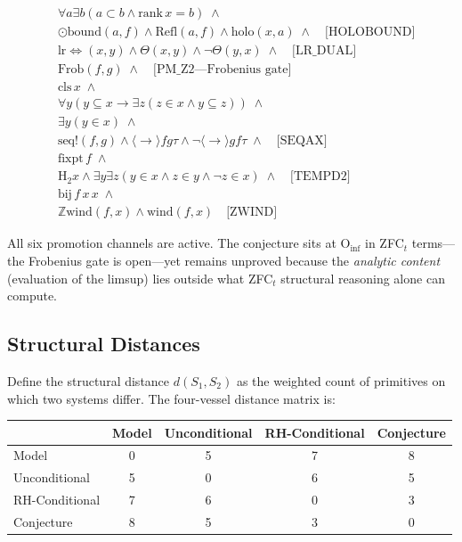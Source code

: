 \documentclass[12pt]{article}
\begin{document}
\begin{equation}\label{eq:cramer_conj_zfc}
\begin{aligned}
&\forall a\exists b(a\subset b \land \text{rank}\,x=b) \;\land \\
&\odot\text{bound}(a,f) \land \text{Refl}(a,f) \land \text{holo}(x,a)
   \;\land \quad\text{[HOLOBOUND]} \\
&\text{lr}{\Leftrightarrow}(x,y) \land \Theta(x,y) \land \lnot\Theta(y,x)
   \;\land \quad\text{[LR\_DUAL]} \\
&\text{Frob}(f,g) \;\land \quad\text{[PM\_Z2---Frobenius gate]} \\
&\text{cls}\,x \;\land \\
&\forall y(y\subseteq x \to \exists z(z\in x \land y\subseteq z)) \;\land \\
&\exists y(y\in x) \;\land \\
&\text{seq!}(f,g) \land \langle\to\rangle f g \tau \land
   \lnot\langle\to\rangle g f \tau \;\land \quad\text{[SEQAX]} \\
&\text{fixpt}\,f \;\land \\
&\text{H}_2 x \land \exists y\exists z(y\in x \land z\in y \land
   \lnot z\in x) \;\land \quad\text{[TEMPD2]} \\
&\text{bij}\,f\,x\,x \;\land \\
&\mathbb{Z}\text{wind}(f,x) \land \text{wind}(f,x)
   \quad\text{[ZWIND]}
\end{aligned}
\end{equation}

All six promotion channels are active. The conjecture sits at
O${}_{\text{inf}}$ in ZFC${}_t$ terms---the Frobenius gate is
open---yet remains unproved because the \emph{analytic content}
(evaluation of the limsup) lies outside what ZFC${}_t$ structural
reasoning alone can compute.

\subsection{Structural Distances}

Define the structural distance $d(S_1,S_2)$ as the weighted count
of primitives on which two systems differ. The four-vessel
distance matrix is:

\begin{center}
\begin{tabular}{l|cccc}
& Model & Unconditional & RH-Conditional & Conjecture \\
\hline
Model              & 0 & 5 & 7 & 8 \\
Unconditional      & 5 & 0 & 6 & 5 \\
RH-Conditional     & 7 & 6 & 0 & 3 \\
Conjecture         & 8 & 5 & 3 & 0 \\
\end{tabular}
\end{center}
\end{document}
